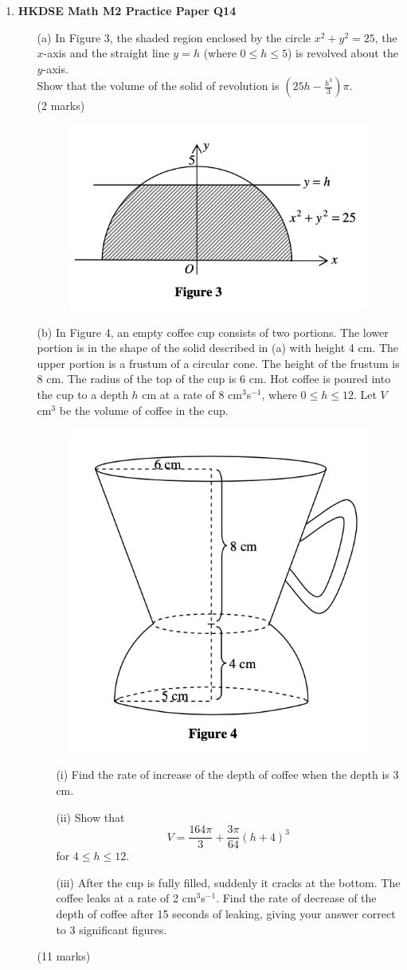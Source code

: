 \documentclass{report}
\begin{document}
\begin{enumerate}
	\item \textbf{HKDSE Math M2 Practice Paper Q14}
	\begin{enumerate}
		\item[(a)]In Figure 3, the shaded region enclosed by the circle $x^2 + y^2 = 25$, the $x$-axis and the straight line $y = h$ (where $0 \leq h \leq 5$) is revolved about the $y$-axis. \\
		Show that the volume of the solid of revolution is $\left(25h - \displaystyle\frac{h^3}{3}\right)\pi$. \\(2 marks)
		\begin{figure}[H]
			\centering
			\includegraphics[width = .5\linewidth]{PPFigure3}
		\end{figure}		
		\item[(b)]In Figure 4, an empty coffee cup consists of two portions. The lower portion is in the shape of the solid described in (a) with height 4 cm. The upper portion is a frustum of a circular cone. The height of the frustum is 8 cm. The radius of the top of the cup is 6 cm. Hot coffee is poured into the cup to a depth $h$ cm at a rate of 8 cm$^3$s$^{-1}$, where $0 \leq h \leq 12$. Let $V$ cm$^3$ be the volume of coffee in the cup. 
		\begin{figure}[H]
			\centering
			\includegraphics[width = .5\linewidth]{PPFigure4}
		\end{figure}
		\begin{enumerate}
			\item [(i)]Find the rate of increase of the depth of coffee when the depth is 3 cm.
			\item [(ii)]Show that $$V = \displaystyle\frac{164\pi}{3} + \frac{3\pi}{64}(h+4)^3$$ for $4\leq h \leq 12$. 
			\item [(iii)]After the cup is fully filled, suddenly it cracks at the bottom. The coffee leaks at a rate of 2 cm$^3$s$^{-1}$. Find the rate of decrease of the depth of coffee after 15 seconds of leaking, giving your answer correct to 3 significant figures.
		\end{enumerate}
		(11 marks)
	\end{enumerate}


\end{enumerate}
\end{document}
